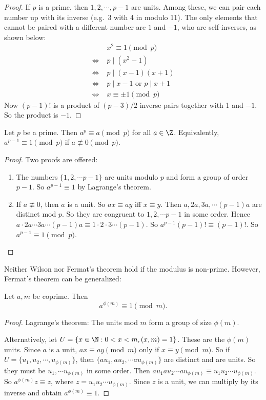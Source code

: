 \documentclass[a4paper]{article}
\begin{document}
\begin{proof}
  If $p$ is a prime, then $1, 2, \cdots, p - 1$ are units. Among these, we can pair each number up with its inverse (e.g.\ 3 with 4 in modulo 11). The only elements that cannot be paired with a different number are $1$ and $-1$, who are self-inverses, as shown below:
  \begin{align*}
    &\;x^2 \equiv 1\pmod p\\
    \Leftrightarrow&\; p \mid (x^2 - 1)\\
    \Leftrightarrow&\; p \mid (x - 1)(x + 1)\\
    \Leftrightarrow&\; p \mid x - 1 \text{ or } p \mid x + 1\\
    \Leftrightarrow&\; x \equiv \pm 1\pmod p
  \end{align*}
  Now $(p - 1)!$ is a product of $(p - 3)/2$ inverse pairs together with 1 and $-1$. So the product is $-1$.
\end{proof}

\begin{thm}
  Let $p$ be a prime. Then $a^p \equiv a\pmod p$ for all $a\in \Z$. Equivalently, $a^{p - 1}\equiv 1\pmod p$ if $a\not\equiv 0 \pmod p$.
\end{thm}

\begin{proof}
  Two proofs are offered:
  \begin{enumerate}
    \item The numbers $\{1, 2, \cdots p - 1\}$ are units modulo $p$ and form a group of order $p - 1$. So $a^{p - 1} \equiv 1$ by Lagrange's theorem.
    \item If $a\not\equiv 0$, then $a$ is a unit. So $ax \equiv ay$ iff $x\equiv y$. Then $a, 2a, 3a, \cdots (p - 1)a$ are distinct mod $p$. So they are congruent to $1, 2, \cdots p -1$ in some order. Hence $a\cdot 2a\cdots 3a\cdots (p - 1)a\equiv 1\cdot 2\cdot 3 \cdots (p - 1)$. So $a^{p - 1}(p - 1)! \equiv (p - 1)!$. So $a^{p - 1} \equiv 1\pmod p$.\qedhere
  \end{enumerate}
\end{proof}
Neither Wilson nor Fermat's theorem hold if the modulus is non-prime. However, Fermat's theorem can be generalized:
\begin{thm}
  Let $a, m$ be coprime. Then
  \[
    a^{\phi(m)} \equiv 1\pmod m.
  \]
\end{thm}

\begin{proof}
  Lagrange's theorem: The units mod $m$ form a group of size $\phi(m)$.

  Alternatively, let $U = \{x\in \N: 0 < x < m, (x, m) = 1\}$. These are the $\phi(m)$ units. Since $a$ is a unit, $ax\equiv ay \pmod m$ only if $x\equiv y\pmod m$. So if $U = \{u_1, u_2, \cdots , u_{\phi(m)}\}$, then $\{au_1, au_2, \cdots au_{\phi(m)}\}$ are distinct and are units. So they must be $u_1, \cdots u_{\phi(m)}$ in some order. Then $au_1au_2\cdots au_{\phi(m)} \equiv u_1u_2\cdots u_{\phi(m)}$. So $a^{\phi(m)}z \equiv z$, where $z = u_1u_2\cdots u_{\phi(m)}$. Since $z$ is a unit, we can multiply by its inverse and obtain $a^{\phi(m)} \equiv 1$.
\end{proof}
\end{document}

